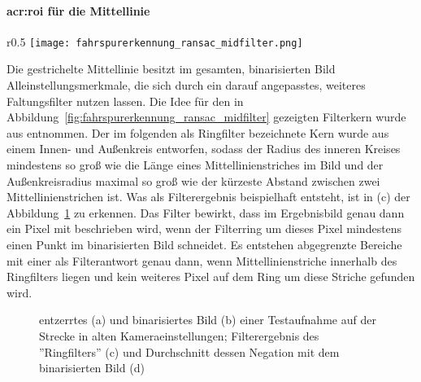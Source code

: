 \paragraph{\gls{acr:roi} für die Mittellinie}

\begin{wrapfigure}{r}{0.5\textwidth}
	\centering
	\texttt{[image: fahrspurerkennung\_ransac\_midfilter.png]}
	\caption{Der Kern des \\ \glqq Ringfilters\grqq}
	\label{fig:fahrspurerkennung_ransac_midfilter}
\end{wrapfigure} 

Die gestrichelte Mittellinie besitzt im gesamten, binarisierten Bild Alleinstellungsmerkmale, die sich durch ein darauf angepasstes, weiteres Faltungsfilter nutzen lassen. Die Idee für den in Abbildung~\ref{fig:fahrspurerkennung_ransac_midfilter} gezeigten Filterkern wurde aus \autocite{drauschkeEchtzeitfaehigeStartpunktalgorithmenFuer2016} entnommen. Der im folgenden als \glqq Ringfilter\grqq{} bezeichnete Kern wurde aus einem Innen- und Außenkreis entworfen, sodass der Radius des inneren Kreises mindestens so groß wie die Länge eines Mittellinienstriches im Bild und der Außenkreisradius maximal so groß wie der kürzeste Abstand zwischen zwei Mittellinienstrichen ist. Was als Filterergebnis beispielhaft entsteht, ist in (c) der Abbildung~\ref{fig:fahrspurerkennung_ransac_binarisieren} zu erkennen. Das Filter bewirkt, dass im Ergebnisbild genau dann ein Pixel mit \grqq{} beschrieben wird, wenn der Filterring um dieses Pixel mindestens einen Punkt im binarisierten Bild schneidet. Es entstehen abgegrenzte Bereiche mit einer \grqq{} als Filterantwort genau dann, wenn Mittellinienstriche innerhalb des \glqq Ringfilters\grqq{} liegen und kein weiteres Pixel auf dem Ring um diese Striche gefunden wird. 

\begin{figure}[htbp]
	\centering
	\hfill
	\hfill
	\hfill
	\caption{entzerrtes (a) und binarisiertes Bild (b) einer Testaufnahme auf der Strecke in alten Kameraeinstellungen; Filterergebnis des ''Ringfilters'' (c) und Durchschnitt dessen Negation mit dem binarisierten Bild (d)}
	\label{fig:fahrspurerkennung_ransac_binarisieren}
\end{figure} 


